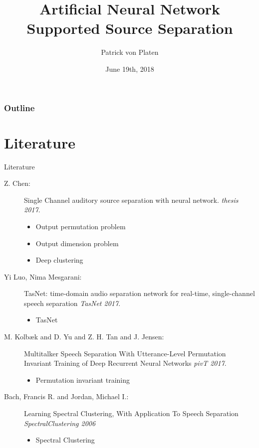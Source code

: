 \documentclass[xcolor=table,mathserif,9pt]{beamer}    %
\title[Seminar]{Artificial Neural Network Supported Source Separation}
\author[Patrick von Platen]{Patrick von Platen}
\institute[RWTH Aachen University] %
{
  \strut Human Language Technology and Pattern Recognition\\
  \strut Computer Science Department, RWTH Aachen University %
}
\date[19/6/2018]{June 19th, 2018}
\begin{document}
\begin{frame}[label=titlepage]
  \titlepage
\end{frame}

\begin{frame}
	\frametitle{Outline}
	\tableofcontents
\end{frame}




\section{Literature}%
\label{sec:literature}


\begin{frame}{Literature}
\begin{description}
\item [Z. Chen:] Single Channel auditory source separation with neural network. {\em thesis 2017}.
  \begin{itemize}
  \item Output permutation problem  
  \item Output dimension problem 
  \item Deep clustering
  \end{itemize}
\item [Yi Luo, Nima Mesgarani:] TasNet: time-domain audio separation network for real-time, single-channel speech separation {\em TasNet 2017}.
  \begin{itemize}
  \item TasNet 
  \end{itemize}
\item [M. Kolbæk and D. Yu and Z. H. Tan and J. Jensen: ]Multitalker Speech Separation With Utterance-Level Permutation Invariant Training of Deep Recurrent Neural Networks {\em pivT 2017}.
  \begin{itemize}
  \item Permutation invariant training 
  \end{itemize}
\item [Bach, Francis R. and Jordan, Michael I.: ]Learning Spectral Clustering, With Application To Speech Separation {\em SpectralClustering 2006}
\begin{itemize}
	\item Spectral Clustering
\end{itemize}
\end{description}
\end{frame}
\end{document}
